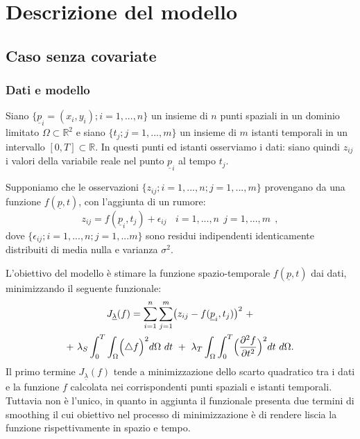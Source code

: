 \documentclass[a4paper,11pt,twoside,openright]{book}							%
\begin{document}
\chapter{Descrizione del modello}

\section{Caso senza covariate}

\subsection*{Dati e modello}

Siano $\{\underline p_i = (x_i,y_i); i=1, ... , n\}$ un insieme di $n$ punti spaziali in un dominio limitato $\Omega \subset \mathbb R^2$ e siano $\{t_j ; j=1, ... , m\}$ un insieme di $m$ istanti temporali in un intervallo $[0,T]\subset \mathbb R$. In questi punti ed istanti osserviamo i dati: siano quindi $z_{ij}$ i valori della variabile reale nel punto $\underline p_i$ al tempo $t_j$.

Supponiamo che le osservazioni $\{ z_{ij};i=1, ... , n; j=1, ... , m \}$ provengano da una funzione $f(\underline p, t)$, con l'aggiunta di un rumore:
\begin{equation}
\label{eq:modellobase}
z_{ij}=f(\underline p_i,t_j)+\epsilon_{ij}\ \ \ \ i = 1,...,n\ \ j=1,...,m \ \ ,
\end{equation}
dove $\{\epsilon_{ij}; i = 1,...,n; j=1,...m\}$ sono residui indipendenti identicamente distribuiti di media nulla e varianza $\sigma^2$.

L'obiettivo del modello è stimare la funzione spazio-temporale $f(\underline p, t)$ dai dati, minimizzando il seguente funzionale:
\begin{multline}
\label{eq:Jfunc}
J_{\underline \lambda }(f) = \sum_{i=1}^n \sum_{j=1}^m \bigl( z_{ij} - f(\underline p_i,t_j) \bigr)^2 \ + \\+\   \lambda_S \int_0^T \int_\Omega \Bigl( \triangle f  \Bigr)^2 d\Omega\ dt \ +\  \lambda_T \int_\Omega \int_0^T \Bigl( \frac{\partial^2 f }{\partial t ^2} \Bigr)^2 dt\ d\Omega .
\end{multline}
Il primo termine $J_{\underline \lambda }(f)$ tende a minimizzazione dello scarto quadratico tra i dati e la funzione $f$ calcolata nei corrispondenti punti spaziali e istanti temporali. Tuttavia non è l'unico, in quanto in aggiunta il funzionale presenta due termini di smoothing il cui obiettivo nel processo di minimizzazione è di rendere liscia la funzione rispettivamente in spazio e tempo.
\end{document}
